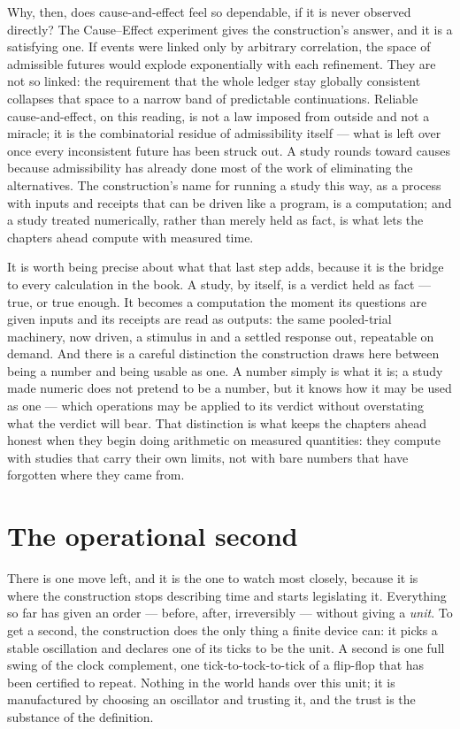 Why, then, does cause-and-effect feel so dependable, if it is never observed directly? The
Cause--Effect experiment gives the construction's answer, and it is a satisfying one. If events were
linked only by arbitrary correlation, the space of admissible futures would explode exponentially with
each refinement. They are not so linked: the requirement that the whole ledger stay globally consistent
collapses that space to a narrow band of predictable continuations. Reliable cause-and-effect, on this
reading, is not a law imposed from outside and not a miracle; it is the combinatorial residue of
admissibility itself --- what is left over once every inconsistent future has been struck out. A study
rounds toward causes because admissibility has already done most of the work of eliminating the
alternatives. The construction's name for running a study this way, as a process with inputs and
receipts that can be driven like a program, is a computation; and a study treated numerically, rather
than merely held as fact, is what lets the chapters ahead compute with measured time.

It is worth being precise about what that last step adds, because it is the bridge to every
calculation in the book. A study, by itself, is a verdict held as fact --- true, or true enough. It
becomes a computation the moment its questions are given inputs and its receipts are read as outputs:
the same pooled-trial machinery, now driven, a stimulus in and a settled response out, repeatable on
demand. And there is a careful distinction the construction draws here between being a number and being
usable as one. A number simply is what it is; a study made numeric does not pretend to be a number,
but it knows how it may be used as one --- which operations may be applied to its verdict without
overstating what the verdict will bear. That distinction is what keeps the chapters ahead honest when
they begin doing arithmetic on measured quantities: they compute with studies that carry their own
limits, not with bare numbers that have forgotten where they came from.

\section{The operational second}
\label{se:the-operational-second}

There is one move left, and it is the one to watch most closely, because it is where the construction
stops describing time and starts legislating it. Everything so far has given an order --- before,
after, irreversibly --- without giving a \emph{unit}. To get a second, the construction does the only
thing a finite device can: it picks a stable oscillation and declares one of its ticks to be the unit.
A second is one full swing of the clock complement, one tick-to-tock-to-tick of a flip-flop that has
been certified to repeat. Nothing in the world hands over this unit; it is manufactured by choosing an
oscillator and trusting it, and the trust is the substance of the definition.


